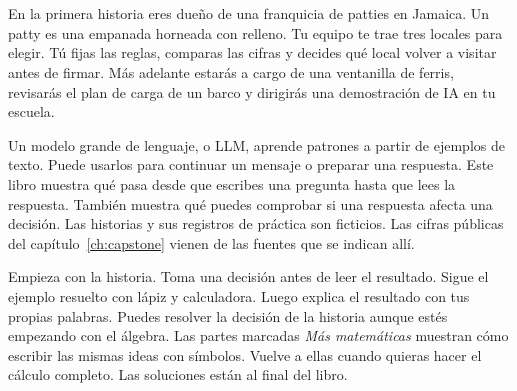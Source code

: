 \chapter{}
{En la primera historia eres dueño de una franquicia de patties en Jamaica. Un patty es una empanada horneada con relleno. Tu equipo te trae tres locales para elegir. Tú fijas las reglas, comparas las cifras y decides qué local volver a visitar antes de firmar. Más adelante estarás a cargo de una ventanilla de ferris, revisarás el plan de carga de un barco y dirigirás una demostración de IA en tu escuela.}

{Un modelo grande de lenguaje, o LLM, aprende patrones a partir de ejemplos de texto. Puede usarlos para continuar un mensaje o preparar una respuesta. Este libro muestra qué pasa desde que escribes una pregunta hasta que lees la respuesta. También muestra qué puedes comprobar si una respuesta afecta una decisión. Las historias y sus registros de práctica son ficticios. Las cifras públicas del capítulo~\ref{ch:capstone} vienen de las fuentes que se indican allí.}

{Empieza con la historia. Toma una decisión antes de leer el resultado. Sigue el ejemplo resuelto con lápiz y calculadora. Luego explica el resultado con tus propias palabras. Puedes resolver la decisión de la historia aunque estés empezando con el álgebra. Las partes marcadas \emph{Más matemáticas} muestran cómo escribir las mismas ideas con símbolos. Vuelve a ellas cuando quieras hacer el cálculo completo. Las soluciones están al final del libro.}

